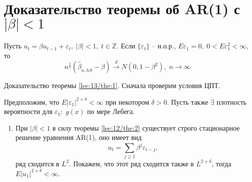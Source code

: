 \section{Доказательство теоремы об AR(1) с $|\beta| < 1$}\label{lec:13/sec:2}

\begin{theorem}\label{lec:13/the:1}
    Пусть $u_t = \beta u_{t - 1} + \varepsilon_t, \; |\beta| < 1, \; t \in \mathbb{Z}.$ Если $\lbrace \varepsilon_t \rbrace $ --  н.о.р., $E\varepsilon_1 = 0, \; 0 < E\varepsilon_1^2 < \infty,$ то
    $$n^{\frac{1}{2}}(\hat{\beta}_{n, hS} - \beta) \stackrel{d}{\rightarrow} N(0, 1 - \beta^2), \; n \rightarrow \infty$$
\end{theorem}
\begin{Proof}
    Доказательство теоремы \ref{lec:13/the:1}. Сначала проверим условия ЦПТ.

    Предположим, что $E|\varepsilon_1|^{2 + \delta} < \infty$ при некотором $\delta > 0.$ Пусть также $\exists $ плотность вероятности для $\varepsilon_1: \; g(x) $ по мере Лебега.
    \begin{enumerate}
        \item При $|\beta| < 1$ в силу теоремы \ref{lec:12/the:2} существует строго стационарное решение уравнения AR(1), оно имеет вид 
        $$u_t = \sum\limits_{j \geq 1} \beta^j \varepsilon_{t - j},$$  
        ряд сходится в $L^2$. Покажем, что этот ряд сходится также в $L^{2 + \delta}$, тогда $E|u_1|^{2 + \delta} < \infty$.


\end{enumerate}
\end{Proof}
